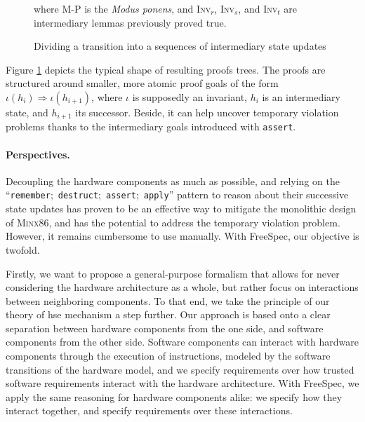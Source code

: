 \begin{figure}
{  \vspace{0.5cm} where {\scshape M-P} is the \emph{Modus ponens}, and {\scshape
    Inv}\( _r \), {\scshape Inv}\( _s \), and {\scshape Inv}\( _t \) are
  intermediary lemmas previously proved true.%
}

\caption{Dividing a transition into a sequences of intermediary state updates}
\label{freespec:figure:seqproof}
\end{figure}

Figure \ref{freespec:figure:seqproof} depicts the typical shape of resulting
proofs trees.
%
The proofs are structured around smaller, more atomic proof goals of the form
\( \iota(h_i) \Rightarrow \iota(h_{i+1}) \), where \( \iota \) is supposedly an
invariant, \( h_i \) is an intermediary state, and \( h_{i+1} \) its successor.
%
Beside, it can help uncover temporary violation problems thanks to the
intermediary goals introduced with \texttt{assert}.

\paragraph{Perspectives.}
%
Decoupling the hardware components as much as possible, and relying on the
``\texttt{remember};~\texttt{destruct};~\texttt{assert};~\texttt{apply}''
pattern to reason about their successive state updates has proven to be an
effective way to mitigate the monolithic design of {\scshape Minx86}, and has
the potential to address the temporary violation problem.
%
However, it remains cumbersome to use manually.
%
With FreeSpec, our objective is twofold.

Firstly, we want to propose a general-purpose formalism that allows for never
considering the hardware architecture as a whole, but rather focus on
interactions between neighboring components.
%
To that end, we take the principle of our theory of \ac{hse} mechanism a step
further.
%
Our approach is based onto a clear separation between hardware components from the
one side, and software components from the other side.
%
Software components can interact with hardware components through the execution
of instructions, modeled by the software transitions of the hardware model, and
we specify requirements over how trusted software requirements interact with the
hardware architecture.
%
With FreeSpec, we apply the same reasoning for hardware components alike: we
specify how they interact together, and specify requirements over these
interactions.

